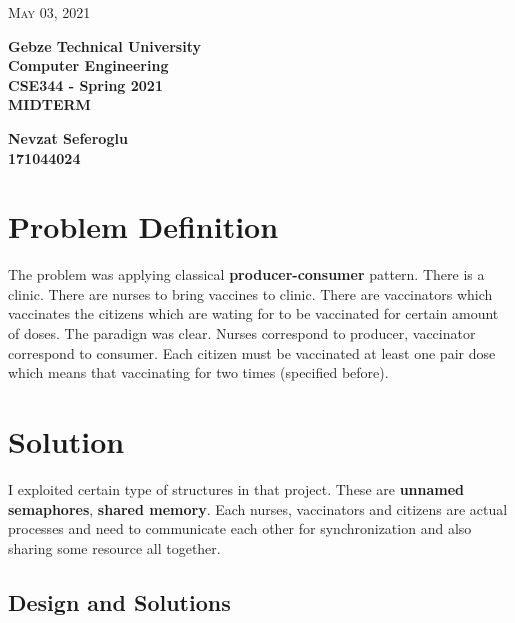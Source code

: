 \documentclass{article}
\begin{document}
\begin{titlepage}

	\begin{flushright}
	\textsc{\large May 03, 2021} \\
	\end{flushright}
	\begin{center}
	\Large{\bfseries Gebze Technical University \\ Computer Engineering \\ CSE344 - Spring 2021 \\ MIDTERM} \\
	\end{center}
	\vspace*{\fill}
	\begin{center}
	\Large{\bfseries Nevzat Seferoglu \\ 171044024 }
	\end{center}
	\vspace*{\fill}
\end{titlepage}

\cleardoublepage
\section{Problem Definition}
The problem was applying classical \textbf{producer-consumer} pattern. There is a clinic. There are nurses to bring vaccines to clinic. There are vaccinators which vaccinates the citizens which are wating for to be vaccinated for certain amount of doses. The paradign was clear. Nurses correspond to producer, vaccinator correspond to consumer. Each citizen must be vaccinated at least one pair dose which means that vaccinating for two times (specified before).

\section{Solution}
I exploited certain type of structures in that project. These are \textbf{unnamed semaphores}, \textbf{shared memory}. Each nurses, vaccinators and citizens are actual processes and need to communicate each other for synchronization and also sharing some resource all together.

\subsection{Design and Solutions}
\end{document}
